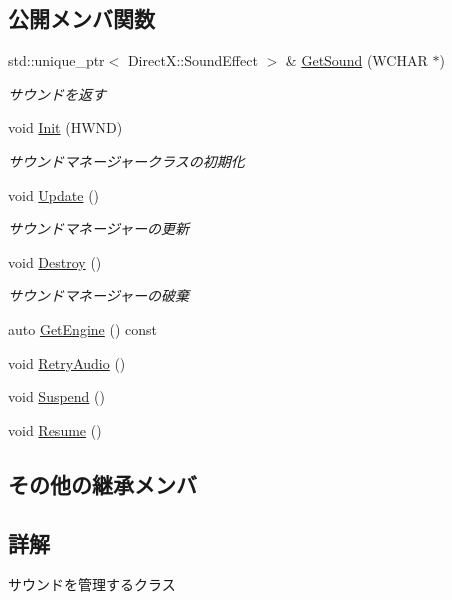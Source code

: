 \subsection*{公開メンバ関数}
\begin{DoxyCompactItemize}
\item 
std\+::unique\+\_\+ptr$<$ Direct\+X\+::\+Sound\+Effect $>$ \& \mbox{\hyperlink{class_sound_manager_a3ba4b2fe49cdc051f33aa800851f8b98}{Get\+Sound}} (W\+C\+H\+AR $\ast$)
\begin{DoxyCompactList}\small\item\em サウンドを返す \end{DoxyCompactList}\item 
void \mbox{\hyperlink{class_sound_manager_adab2bc016911756ffd973c7d781b5cfb}{Init}} (H\+W\+ND)
\begin{DoxyCompactList}\small\item\em サウンドマネージャークラスの初期化 \end{DoxyCompactList}\item 
void \mbox{\hyperlink{class_sound_manager_aaf241621221cdbefeba78e8b6bc29240}{Update}} ()
\begin{DoxyCompactList}\small\item\em サウンドマネージャーの更新 \end{DoxyCompactList}\item 
void \mbox{\hyperlink{class_sound_manager_abf0d473d0a31323c8e74684976b08e7f}{Destroy}} ()
\begin{DoxyCompactList}\small\item\em サウンドマネージャーの破棄 \end{DoxyCompactList}\item 
auto \mbox{\hyperlink{class_sound_manager_a5a575ac572eb0b50b3bb48b879a1a7e6}{Get\+Engine}} () const
\item 
void \mbox{\hyperlink{class_sound_manager_acc9fb61509f30c7eb9136386eeeb9f94}{Retry\+Audio}} ()
\item 
void \mbox{\hyperlink{class_sound_manager_a97d76cb22596fbb3c85766df0dcde757}{Suspend}} ()
\item 
void \mbox{\hyperlink{class_sound_manager_a6107940d2299131fbd7991a4f222491b}{Resume}} ()
\end{DoxyCompactItemize}
\subsection*{その他の継承メンバ}


\subsection{詳解}
サウンドを管理するクラス 

